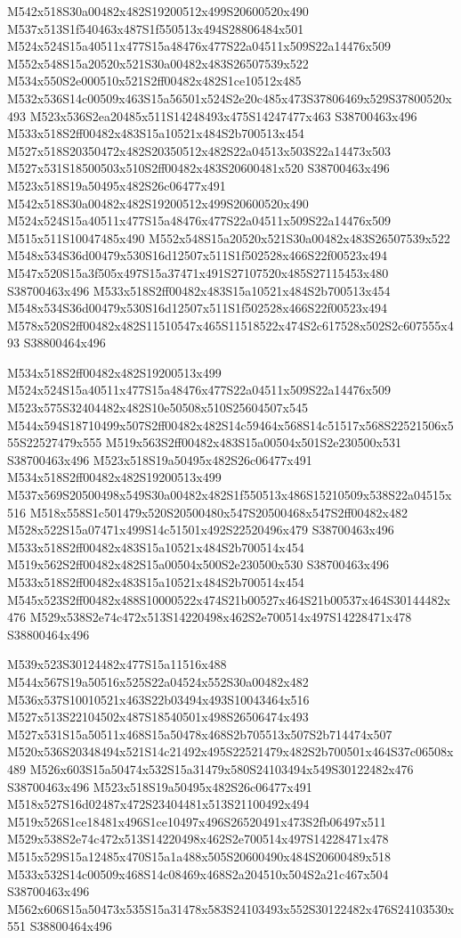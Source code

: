 \documentclass{article}
\begin{document}
\begin{multicols}{2}
M542x518S30a00482x482S19200512x499S20600520x490 M537x513S1f540463x487S1f550513x494S28806484x501 M524x524S15a40511x477S15a48476x477S22a04511x509S22a14476x509 M552x548S15a20520x521S30a00482x483S26507539x522 M534x550S2e000510x521S2ff00482x482S1ce10512x485 M532x536S14c00509x463S15a56501x524S2e20c485x473S37806469x529S37800520x493 M523x536S2ea20485x511S14248493x475S14247477x463 S38700463x496 M533x518S2ff00482x483S15a10521x484S2b700513x454 M527x518S20350472x482S20350512x482S22a04513x503S22a14473x503 M527x531S18500503x510S2ff00482x483S20600481x520 S38700463x496 M523x518S19a50495x482S26c06477x491 M542x518S30a00482x482S19200512x499S20600520x490 M524x524S15a40511x477S15a48476x477S22a04511x509S22a14476x509 M515x511S10047485x490 M552x548S15a20520x521S30a00482x483S26507539x522 M548x534S36d00479x530S16d12507x511S1f502528x466S22f00523x494 M547x520S15a3f505x497S15a37471x491S27107520x485S27115453x480 S38700463x496 M533x518S2ff00482x483S15a10521x484S2b700513x454 M548x534S36d00479x530S16d12507x511S1f502528x466S22f00523x494 M578x520S2ff00482x482S11510547x465S11518522x474S2c617528x502S2c607555x493 S38800464x496

M534x518S2ff00482x482S19200513x499 M524x524S15a40511x477S15a48476x477S22a04511x509S22a14476x509 M523x575S32404482x482S10e50508x510S25604507x545 M544x594S18710499x507S2ff00482x482S14c59464x568S14c51517x568S22521506x555S22527479x555 M519x563S2ff00482x483S15a00504x501S2e230500x531 S38700463x496 M523x518S19a50495x482S26c06477x491 M534x518S2ff00482x482S19200513x499 M537x569S20500498x549S30a00482x482S1f550513x486S15210509x538S22a04515x516 M518x558S1c501479x520S20500480x547S20500468x547S2ff00482x482 M528x522S15a07471x499S14c51501x492S22520496x479 S38700463x496 M533x518S2ff00482x483S15a10521x484S2b700514x454 M519x562S2ff00482x482S15a00504x500S2e230500x530 S38700463x496 M533x518S2ff00482x483S15a10521x484S2b700514x454 M545x523S2ff00482x488S10000522x474S21b00527x464S21b00537x464S30144482x476 M529x538S2e74c472x513S14220498x462S2e700514x497S14228471x478 S38800464x496

M539x523S30124482x477S15a11516x488 M544x567S19a50516x525S22a04524x552S30a00482x482 M536x537S10010521x463S22b03494x493S10043464x516 M527x513S22104502x487S18540501x498S26506474x493 M527x531S15a50511x468S15a50478x468S2b705513x507S2b714474x507 M520x536S20348494x521S14c21492x495S22521479x482S2b700501x464S37c06508x489 M526x603S15a50474x532S15a31479x580S24103494x549S30122482x476 S38700463x496 M523x518S19a50495x482S26c06477x491 M518x527S16d02487x472S23404481x513S21100492x494 M519x526S1ce18481x496S1ce10497x496S26520491x473S2fb06497x511 M529x538S2e74c472x513S14220498x462S2e700514x497S14228471x478 M515x529S15a12485x470S15a1a488x505S20600490x484S20600489x518 M533x532S14c00509x468S14c08469x468S2a204510x504S2a21c467x504 S38700463x496 M562x606S15a50473x535S15a31478x583S24103493x552S30122482x476S24103530x551 S38800464x496


\end{multicols}
\end{document}
